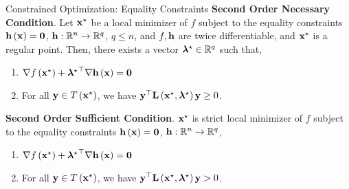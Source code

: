 \documentclass[aspectratio=169]{beamer}
\let\olditem\item
\renewcommand{\item}{\setlength{\itemsep}{\fill}\olditem}
\def\mf{\ensuremath\mathbf}
\def\mb{\ensuremath\mathbb}
\def\lp{\ensuremath\left(}
\def\rp{\ensuremath\right)}
\def\R{\ensuremath\mb{R}}
\newcommand{\ct}[1]{\lp #1\rp}
\begin{document}
\begin{frame}[t]{Constrained Optimization: Equality Constraints}
  \textbf{Second Order Necessary Condition}. Let $\mf{x}^\star$ be a local minimizer of $f$ subject to the equality constraints $\mf{h}\ct{\mf{x}} = \mf{0}$, $\mf{h}: \R^n \to \R^q$, $q \leq n$, and $f, \mf{h}$ are twice differentiable, and $\mf{x}^\star$ is a regular point. Then, there exists a vector $\bm{\lambda}^\star \in \R^q$ such that,
  \begin{enumerate}
    \item $\nabla f\ct{\mf{x}^\star} + {\bm{\lambda}^\star}^\top \nabla \mf{h}\ct{\mf{x}} = \mf{0}$
    \item For all $\mf{y} \in T\ct{\mf{x}^\star}$, we have $\mf{y}^\top \mf{L}\ct{\mf{x}^\star, \bm{\lambda}^\star}\mf{y} \geq 0$.
  \end{enumerate}
  \vspace{1cm}

  \textbf{Second Order Sufficient Condition}. $\mf{x}^\star$ is strict local minimizer of $f$ subject to the equality constraints $\mf{h}\ct{\mf{x}} = \mf{0}$, $\mf{h}: \R^n \to \R^q$,
  \begin{enumerate}
    \item $\nabla f\ct{\mf{x}^\star} + {\bm{\lambda}^\star}^\top \nabla \mf{h}\ct{\mf{x}} = \mf{0}$
    \item For all $\mf{y} \in T\ct{\mf{x}^\star}$, we have $\mf{y}^\top \mf{L}\ct{\mf{x}^\star, \bm{\lambda}^\star}\mf{y} > 0$.
  \end{enumerate}
\end{frame}
\end{document}
